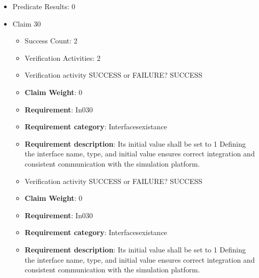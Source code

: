 \documentclass{article}
\begin{document}
\begin{itemize}
\begin{itemize}
					\item Verification activity SUCCESS or FAILURE? SUCCESS
					\item \textbf{Claim Weight}: 0
						\item \textbf{Requirement}: In029 
						\item \textbf{Requirement category}: Interfacesexistance 
						\item \textbf{Requirement description}: Its initial value shall be set to 0 Defining the interface name, type, and initial value ensures correct integration and consistent communication with the simulation platform.
					
				\end{itemize}
				
									    
				\item Predicate Results: 0

  				  \item Claim 30
				\begin{itemize}
			    	\item Success Count: 2 
			    	\item Verification Activities: 2
					\item Verification activity SUCCESS or FAILURE? SUCCESS
					\item \textbf{Claim Weight}: 0
						\item \textbf{Requirement}: In030 
						\item \textbf{Requirement category}: Interfacesexistance 
						\item \textbf{Requirement description}: Its initial value shall be set to 1 Defining the interface name, type, and initial value ensures correct integration and consistent communication with the simulation platform.
					
					\item Verification activity SUCCESS or FAILURE? SUCCESS
					\item \textbf{Claim Weight}: 0
						\item \textbf{Requirement}: In030 
						\item \textbf{Requirement category}: Interfacesexistance 
						\item \textbf{Requirement description}: Its initial value shall be set to 1 Defining the interface name, type, and initial value ensures correct integration and consistent communication with the simulation platform.
					
				\end{itemize}
				

\end{itemize}
\end{document}
